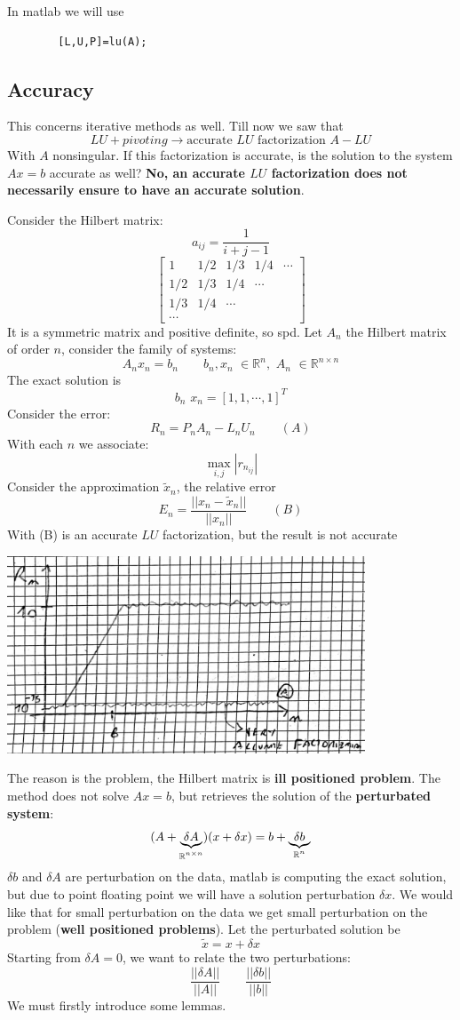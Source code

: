     In matlab we will use
    \begin{lstlisting}
        [L,U,P]=lu(A);
    \end{lstlisting}

\subsection{Accuracy}
This concerns iterative methods as well. Till now we saw that
$$
LU+pivoting\rightarrow \text{accurate $LU$ factorization $A-LU$}
$$
With $A$ nonsingular. If this factorization is accurate, is the solution to the system $Ax=b$ accurate as well? \textbf{No, an accurate $LU$ factorization does not necessarily ensure to have an accurate solution}.

Consider the Hilbert matrix:
$$
a_{ij}=\frac{1}{i+j-1}
$$
$$
\begin{bmatrix}
    1 & 1/2 & 1/3 & 1/4 & \cdots\\
    1/2 & 1/3 & 1/4 & \cdots\\
    1/3 & 1/4 & \cdots\\
    \cdots
\end{bmatrix}
$$
It is a symmetric matrix and positive definite, so spd. Let $A_n$ the Hilbert matrix of order $n$, consider the family of systems:
$$
A_nx_n=b_n\qquad b_n,x_n\,\,\in\mathbb{R}^n,\,\,A_n\,\,\in\mathbb{R}^{n\times n}
$$
The exact solution is
$$
b_n\,\,x_n=[1,1,\cdots,1]^T
$$
Consider the error:
$$
R_n=P_nA_n-L_nU_n\qquad(A)
$$
With each $n$ we associate:
$$
\max_{i,j}\left|r_{n_{ij}}\right|
$$
Consider the approximation $\tilde{x}_n$, the relative error
$$
E_n=\frac{||x_n-\tilde{x}_n||}{||x_n||}\qquad(B)
$$
With (B) is an accurate $LU$ factorization, but the result is not accurate
\begin{center}
    \includegraphics[width=0.8\textwidth]{images/accLU.png}
\end{center}
The reason is the problem, the Hilbert matrix is \textbf{ill positioned problem}. The method does not solve $Ax=b$, but retrieves the solution of the \textbf{perturbated system}:
$$
(A+\underlabel{\delta A}{$\mathbb{R}^{n\times n}$})(x+\delta x)=b+\underlabel{\delta b}{$\mathbb{R}^n$}
$$
$\delta b$ and $\delta A$ are perturbation on the data, matlab is computing the exact solution, but due to point floating point we will have a solution perturbation $\delta x$. We would like that for small perturbation on the data we get small perturbation on the problem (\textbf{well positioned problems}). Let the perturbated solution be
$$
\tilde{x}=x+\delta x
$$
Starting from $\delta A=0$, we want to relate the two perturbations:
$$\frac{||\delta A||}{||A||}\qquad\frac{||\delta b||}{||b||}$$
We must firstly introduce some lemmas.

